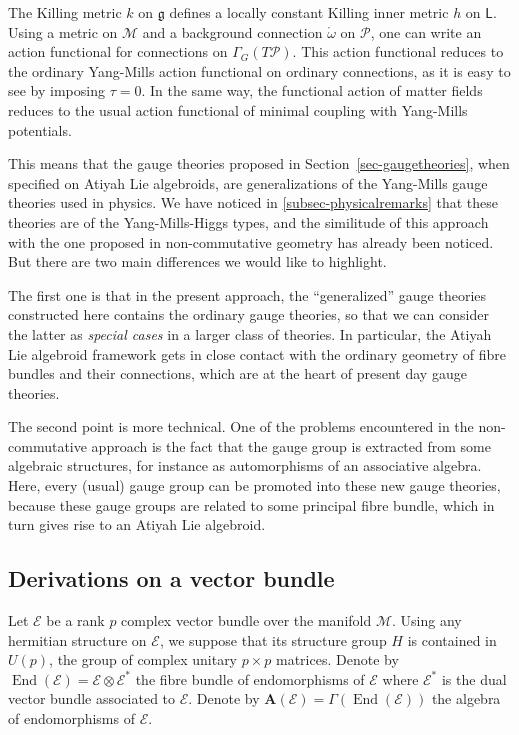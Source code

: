 \documentclass[number]{elsarticle}
\theoremstyle{definition}
\theoremstyle{remark}
\numberwithin{equation}{section}
\begin{document}
The Killing metric $k$ on ${{\mathfrak g}}$ defines a locally constant Killing inner metric $h$ on ${{{{\mathbf{\mathsf{{L}}}}}}}$. Using a metric on ${{{{\mathcal{{M}}}}}}$ and a background connection ${{\mathring{{\omega}}}}$ on ${{{{\mathcal{{P}}}}}}$, one can write an action functional for connections on $\Gamma_G(T{{{{\mathcal{{P}}}}}})$. This action functional reduces to the ordinary Yang-Mills action functional on ordinary connections, as it is easy to see by imposing ${\tau}=0$. In the same way, the functional action of matter fields reduces to the usual action functional of minimal coupling with Yang-Mills potentials.

This means that the gauge theories proposed in Section~\ref{sec-gaugetheories}, when specified on Atiyah Lie algebroids, are generalizations of the Yang-Mills gauge theories used in physics. We have noticed in \ref{subsec-physicalremarks} that these theories are of the Yang-Mills-Higgs types, and the similitude of this approach with the one proposed in non-commutative geometry has already been noticed. But there are two main differences we would like to highlight. 

The first one is that in the present approach, the ``generalized'' gauge theories constructed here contains the ordinary gauge theories, so that we can consider the latter as \emph{special cases} in a larger class of theories. In particular, the Atiyah Lie algebroid framework gets in close contact with the ordinary geometry of fibre bundles and their connections, which are at the heart of present day gauge theories. 

The second point is more technical. One of the problems encountered in the non-commutative approach is the fact that the gauge group is extracted from some algebraic structures, for instance as automorphisms of an associative algebra. Here, every (usual) gauge group can be promoted into these new gauge theories, because these gauge groups are related to some principal fibre bundle, which in turn gives rise to an Atiyah Lie algebroid.

\subsection{Derivations on a vector bundle}
\label{subsec-Derivationsonavectorbundle}

Let ${{{{\mathcal{{E}}}}}}$ be a rank $p$ complex vector bundle over the manifold ${{{{\mathcal{{M}}}}}}$. Using any hermitian structure on ${{{{\mathcal{{E}}}}}}$, we suppose that its structure group $H$ is contained in $U(p)$, the group of complex unitary $p\times p$ matrices. Denote by $\operatorname{End}({{{{\mathcal{{E}}}}}}) = {{{{\mathcal{{E}}}}}} \otimes {{{{\mathcal{{E}}}}}}^\ast$ the fibre bundle of endomorphisms of ${{{{\mathcal{{E}}}}}}$ where ${{{{\mathcal{{E}}}}}}^\ast$ is the dual vector bundle associated to ${{{{\mathcal{{E}}}}}}$. Denote by ${{{{\mathbf{{A}}}}}}({{{{\mathcal{{E}}}}}}) = \Gamma(\operatorname{End}({{{{\mathcal{{E}}}}}}))$ the algebra of endomorphisms of ${{{{\mathcal{{E}}}}}}$.
\end{document}
